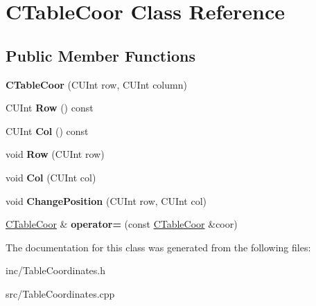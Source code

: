 \hypertarget{classCTableCoor}{\section{C\-Table\-Coor Class Reference}
\label{classCTableCoor}
}
\subsection*{Public Member Functions}
\begin{DoxyCompactItemize}
\item 
\hypertarget{classCTableCoor_a563cdff97f0d7845be0bac884c2ee4b8}{{\bfseries C\-Table\-Coor} (C\-U\-Int row, C\-U\-Int column)}\label{classCTableCoor_a563cdff97f0d7845be0bac884c2ee4b8}

\item 
\hypertarget{classCTableCoor_a9766e415c31d1fc93686680b95387278}{C\-U\-Int {\bfseries Row} () const }\label{classCTableCoor_a9766e415c31d1fc93686680b95387278}

\item 
\hypertarget{classCTableCoor_a9efb127e100fe0c2c60879fe24cc0e96}{C\-U\-Int {\bfseries Col} () const }\label{classCTableCoor_a9efb127e100fe0c2c60879fe24cc0e96}

\item 
\hypertarget{classCTableCoor_a1c0578a6b9028bfa3667c4157f8b6cb0}{void {\bfseries Row} (C\-U\-Int row)}\label{classCTableCoor_a1c0578a6b9028bfa3667c4157f8b6cb0}

\item 
\hypertarget{classCTableCoor_a06a9f17cdd0f93d878c81d411cc9ec49}{void {\bfseries Col} (C\-U\-Int col)}\label{classCTableCoor_a06a9f17cdd0f93d878c81d411cc9ec49}

\item 
\hypertarget{classCTableCoor_af61a668edc8d8ddffca9ec5ad1ef508a}{void {\bfseries Change\-Position} (C\-U\-Int row, C\-U\-Int col)}\label{classCTableCoor_af61a668edc8d8ddffca9ec5ad1ef508a}

\item 
\hypertarget{classCTableCoor_ab55b738e5cc37d397de79d353d7a35f9}{\hyperlink{classCTableCoor}{C\-Table\-Coor} \& {\bfseries operator=} (const \hyperlink{classCTableCoor}{C\-Table\-Coor} \&coor)}\label{classCTableCoor_ab55b738e5cc37d397de79d353d7a35f9}

\end{DoxyCompactItemize}


The documentation for this class was generated from the following files\-:\begin{DoxyCompactItemize}
\item 
inc/Table\-Coordinates.\-h\item 
src/Table\-Coordinates.\-cpp\end{DoxyCompactItemize}

